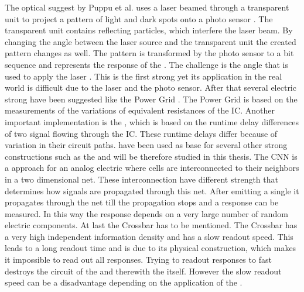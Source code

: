 The optical \puf suggest by Puppu et al. uses a laser beamed through a transparent unit to project a pattern of light and dark spots onto a photo sensor \cite{Pappu2001PhysicalFunctions}.
The transparent unit contains reflecting particles, which interfere the laser beam.
By changing the angle between the laser source and the transparent unit the created pattern changes as well.
The pattern is transformed by the photo sensor to a bit sequence and represents the response of the \puf.
The challenge is the angle that is used to apply the laser \cite{Pappu2001PhysicalFunctions}.
This is the first strong \puf yet its application in the real world is difficult due to the laser and the photo sensor.
After that several electric strong \puf have been suggested like the Power Grid \puf.
The Power Grid \puf is based on the measurements of the variations of equivalent resistances of the \ac{IC}. %
Another important implementation is the \apuf, which is based on the runtime delay differences of two signal flowing through the \ac{IC}.
These runtime delays differ because of variation in their circuit paths.
\apufs have been used as base for several other strong \puf constructions such as the \xpuf and will be therefore studied in this thesis. %
The \ac{CNN} \puf is a approach for an analog electric \puf where cells are interconnected to their neighbors in a two dimensional net.
These interconnection have different strength that determines how signals are propagated through this net.
After emitting a single it propagates through the net till the propagation stops and a response can be measured.
In this way the response depends on a very large number of random electric components. %
At last the Crossbar \puf has to be mentioned.
The Crossbar \puf has a very high independent information density and has a slow readout speed.
This leads to a long readout time and is due to its physical construction, which makes it impossible to read out all responses. 
Trying to readout responses to fast destroys the circuit of the \puf and therewith the \puf itself.
However the slow readout speed can be a disadvantage depending on the application of the \puf. %

